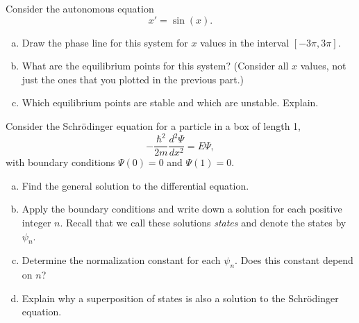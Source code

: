 \documentclass[12pt]{amsbook}
\begin{document}
\newpage
\begin{problem}
Consider the autonomous equation 
\[
x' = \sin(x).
\]
\begin{enumerate}[(a)]
    \item Draw the phase line for this system for $x$ values in the interval $[-3\pi, 3\pi]$. 
    \item What are the equilibrium points for this system? (Consider all $x$ values, not just the ones that you plotted in the previous part.)
    \item Which equilibrium points are stable and which are unstable. Explain.
\end{enumerate}
\end{problem}


\newpage
\begin{problem}
Consider the Schr\"odinger equation for a particle in a box of length 1,
\[
-\frac{\hbar^2}{2m}\frac{d^2 \Psi}{dx^2} = E\Psi,
\]
with boundary conditions $\Psi(0)=0$ and $\Psi(1)=0$.
\begin{enumerate}[(a)]
    \item Find the general solution to the differential equation.
    \item Apply the boundary conditions and write down a solution for each positive integer $n$. Recall that we call these solutions \emph{states} and denote the states by $\psi_n$.
    \item Determine the normalization constant for each $\psi_n$.  Does this constant depend on $n$?
    \item Explain why a superposition of states is also a solution to the Schr\"odinger equation.
\end{enumerate}
\end{problem}
\end{document}

